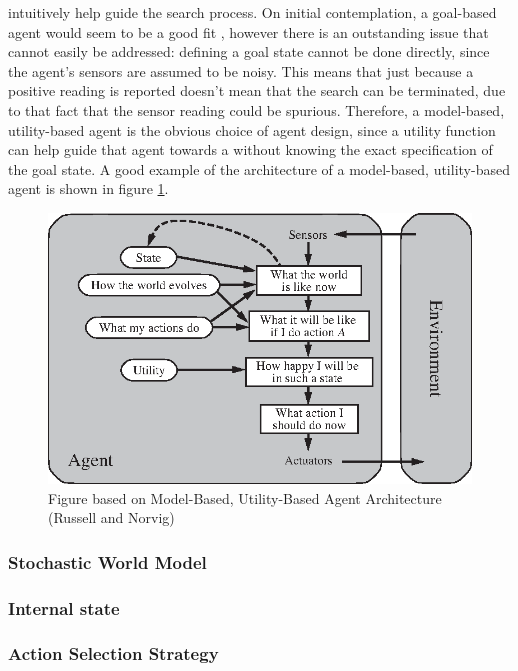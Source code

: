 intuitively help guide the search process. On initial contemplation, a goal-based agent would seem to be a good fit , however there is an outstanding issue that cannot easily be addressed: defining a goal state cannot be done directly, since the agent's sensors are assumed to be noisy. This means that just because a positive reading is reported doesn't mean that the search can be terminated, due to that fact that the sensor reading could be spurious. Therefore, a model-based, utility-based agent is the obvious choice of agent design, since a utility function can help guide that agent towards a  without knowing the exact specification of the goal state. A good example of the architecture of a model-based, utility-based agent is shown in figure \ref{fig:model_based_utility_based}.
\begin{figure}
    \centering
    \includegraphics{Chapters/MultiAgentTargetDetection/BayesianFiltering/Figs/utility-based-agent.eps}
    \caption{Figure based on Model-Based, Utility-Based Agent Architecture (Russell and Norvig)\cite[p.~54]{AIAMA}}
    \label{fig:model_based_utility_based}
\end{figure}


\subsubsection{Stochastic World Model}
\placeholder



\subsubsection{Internal state}
\placeholder

\subsubsection{Action Selection Strategy}
\placeholder

